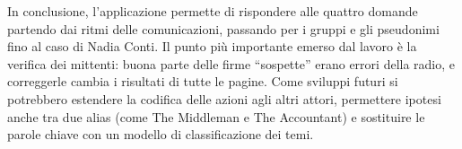 \documentclass[11pt,a4paper]{article}
\begin{document}
In conclusione, l'applicazione permette di rispondere alle quattro domande partendo dai ritmi delle
comunicazioni, passando per i gruppi e gli pseudonimi fino al caso di Nadia Conti. Il punto più importante
emerso dal lavoro è la verifica dei mittenti: buona parte delle firme ``sospette'' erano errori della radio, e
correggerle cambia i risultati di tutte le pagine. Come sviluppi futuri si potrebbero estendere la codifica delle
azioni agli altri attori, permettere ipotesi anche tra due alias (come The Middleman e The Accountant) e
sostituire le parole chiave con un modello di classificazione dei temi.
\end{document}
